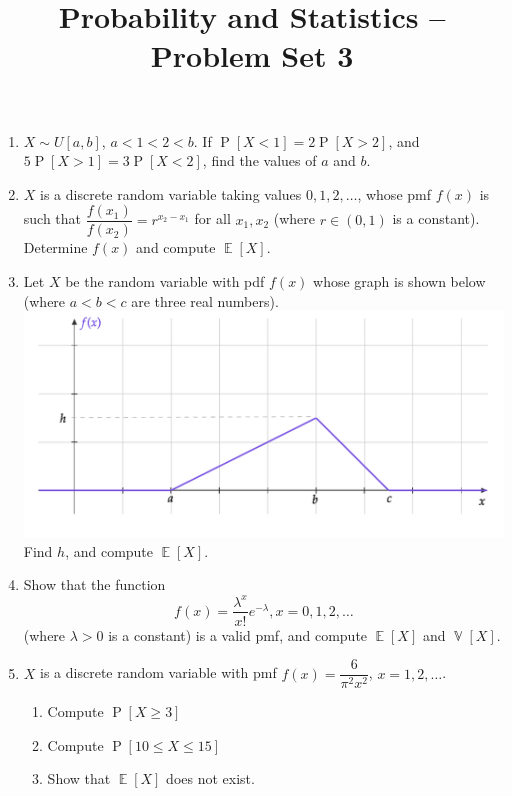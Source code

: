 \documentclass[svgnames]{amsart}
\title[]{Probability and Statistics -- Problem Set 3}
\DeclareMathOperator{\Prob}{P}
\DeclareMathOperator{\EV}{\mathbb E}
\DeclareMathOperator{\Var}{\mathbb V}
\begin{document}
\maketitle
\begin{enumerate}[leftmargin=*]
\item $X \sim U[a,b]$, $a < 1 < 2 < b$. If $\Prob[X < 1] = 2\Prob[X > 2]$, and $5\Prob[X > 1] = 3\Prob[X < 2]$, find the values of $a$ and $b$.

\item $X$ is a discrete random variable taking values $0, 1, 2, \ldots$, whose pmf $f(x)$ is such that $\dfrac{f(x_1)}{f(x_2)} = r^{x_2 - x_1}$ for all $x_1, x_2$ (where $r \in (0, 1)$ is a constant). Determine $f(x)$ and compute $\EV[X]$.

\item Let $X$ be the random variable with pdf $f(x)$ whose graph is shown below (where $a < b < c$ are three real numbers).\\
\includegraphics[scale=0.6]{Set3Graph.pdf}\\
Find $h$, and compute $\EV[X]$.

\item Show that the function
\begin{equation*}
f(x) = \dfrac{\lambda^x}{x!}e^{-\lambda}, x = 0, 1, 2, \ldots
\end{equation*}
(where $\lambda > 0$ is a constant) is a valid pmf, and compute $\EV[X]$ and $\Var[X]$.

\item $X$ is a discrete random variable with pmf $f(x) = \dfrac{6}{\pi^2 x^2}$, $x = 1, 2, \ldots$.
\begin{enumerate}
	\item Compute $\Prob[X \ge 3]$
	\item Compute $\Prob[10 \le X \le 15]$
	\item Show that $\EV[X]$ does not exist.
\end{enumerate}


\end{enumerate}
\end{document}
